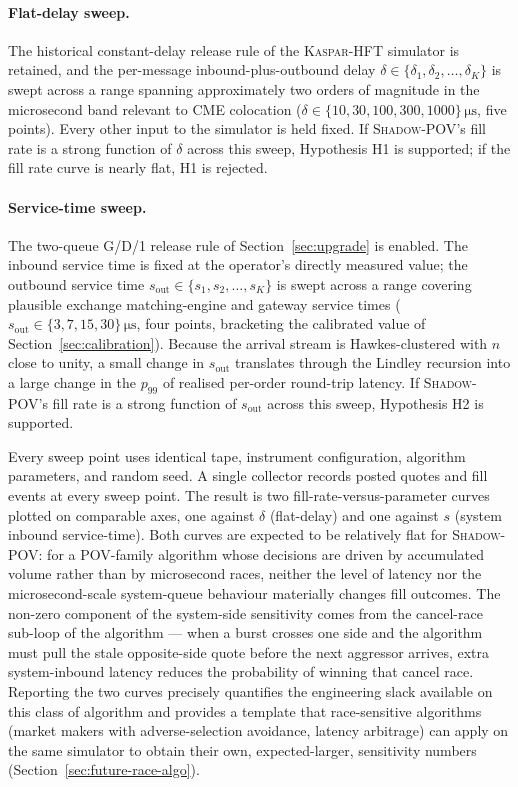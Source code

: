 \documentclass[11pt]{article}
\newcommand{\kasparhft}{\textsc{Kaspar-HFT}}
\newcommand{\shadowpov}{\textsc{Shadow-POV}}
\begin{document}
\paragraph{Flat-delay sweep.}
The historical constant-delay release rule of the \kasparhft{} simulator is retained, and the per-message inbound-plus-outbound delay $\delta \in \{\delta_1, \delta_2, \dots, \delta_K\}$ is swept across a range spanning approximately two orders of magnitude in the microsecond band relevant to CME colocation ($\delta \in \{10, 30, 100, 300, 1000\}\,\si{\micro\second}$, five points). Every other input to the simulator is held fixed. If \shadowpov{}'s fill rate is a strong function of $\delta$ across this sweep, Hypothesis H1 is supported; if the fill rate curve is nearly flat, H1 is rejected.

\paragraph{Service-time sweep.}
The two-queue G/D/1 release rule of Section~\ref{sec:upgrade} is enabled. The inbound service time is fixed at the operator's directly measured value; the outbound service time $s_{\mathrm{out}} \in \{s_1, s_2, \dots, s_K\}$ is swept across a range covering plausible exchange matching-engine and gateway service times ($s_{\mathrm{out}} \in \{3, 7, 15, 30\}\,\si{\micro\second}$, four points, bracketing the calibrated value of Section~\ref{sec:calibration}). Because the arrival stream is Hawkes-clustered with $n$ close to unity, a small change in $s_{\mathrm{out}}$ translates through the Lindley recursion into a large change in the $p_{99}$ of realised per-order round-trip latency. If \shadowpov{}'s fill rate is a strong function of $s_{\mathrm{out}}$ across this sweep, Hypothesis H2 is supported.

Every sweep point uses identical tape, instrument configuration, algorithm parameters, and random seed. A single collector records posted quotes and fill events at every sweep point. The result is two fill-rate-versus-parameter curves plotted on comparable axes, one against $\delta$ (flat-delay) and one against $s$ (system inbound service-time). Both curves are expected to be relatively flat for \shadowpov{}: for a POV-family algorithm whose decisions are driven by accumulated volume rather than by microsecond races, neither the level of latency nor the microsecond-scale system-queue behaviour materially changes fill outcomes. The non-zero component of the system-side sensitivity comes from the cancel-race sub-loop of the algorithm --- when a burst crosses one side and the algorithm must pull the stale opposite-side quote before the next aggressor arrives, extra system-inbound latency reduces the probability of winning that cancel race. Reporting the two curves precisely quantifies the engineering slack available on this class of algorithm and provides a template that race-sensitive algorithms (market makers with adverse-selection avoidance, latency arbitrage) can apply on the same simulator to obtain their own, expected-larger, sensitivity numbers (Section~\ref{sec:future-race-algo}).
\end{document}

